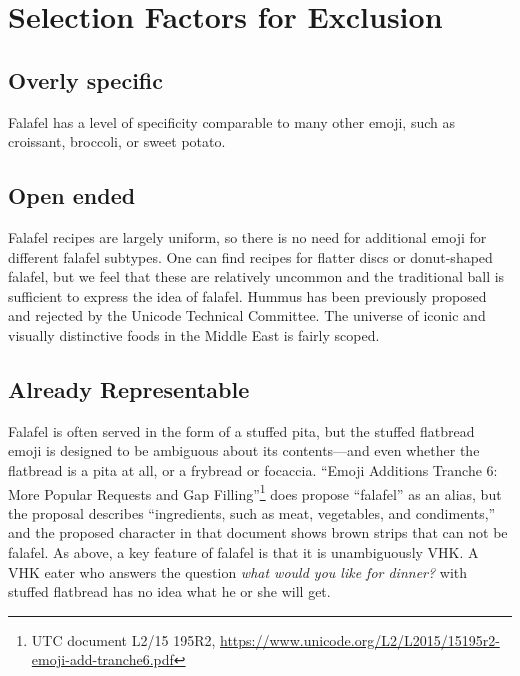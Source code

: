 \documentclass[a4paper,10pt]{article}
\begin{document}
\section{Selection Factors for Exclusion}

\subsection{Overly specific}

{\sc Falafel} has a level of specificity comparable to many other emoji, such as
{\sc croissant}, {\sc broccoli}, or {\sc sweet potato}.

\subsection{Open ended}

Falafel recipes are largely uniform, so there is no need for additional emoji for
different falafel subtypes. One can find recipes for flatter discs or donut-shaped
falafel, but we feel that these are relatively uncommon and the traditional ball is
sufficient to express the idea of falafel.
{\sc Hummus} has been previously proposed and rejected
by the Unicode Technical Committee. The universe of iconic and visually distinctive
foods in the Middle East is fairly scoped.

\subsection{Already Representable}

Falafel is often served in the form of a stuffed pita, but the {\sc stuffed flatbread}
emoji is designed to be ambiguous about its contents---and even whether the flatbread is a
pita at all, or a frybread or focaccia. ``Emoji Additions Tranche 6: More
Popular Requests and Gap Filling''\footnote{UTC document L2/15 195R2, \url{https://www.unicode.org/L2/L2015/15195r2-emoji-add-tranche6.pdf}} does propose ``falafel'' as an alias,
but the proposal describes ``ingredients, such as meat, vegetables, and condiments,''
and the proposed character in that document shows brown strips that can not be falafel.
As above, a key feature of falafel is that it is unambiguously VHK.  A VHK eater who
answers the question {\em what would you like for dinner?} with {\sc stuffed flatbread}
has no idea what he or she will get.
\end{document}
